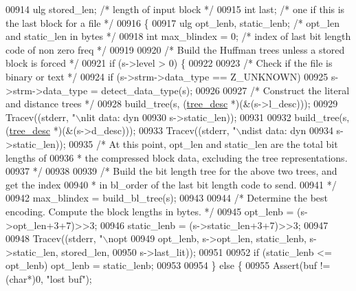 \begin{DoxyCode}
{{{{{{{{{{{{{{{{{{00914     ulg stored\_len;   \textcolor{comment}{/* length of input block */}
00915     \textcolor{keywordtype}{int} last;         \textcolor{comment}{/* one if this is the last block for a file */}
00916 \{
00917     ulg opt\_lenb, static\_lenb; \textcolor{comment}{/* opt\_len and static\_len in bytes */}
00918     \textcolor{keywordtype}{int} max\_blindex = 0;  \textcolor{comment}{/* index of last bit length code of non zero freq */}
00919 
00920     \textcolor{comment}{/* Build the Huffman trees unless a stored block is forced */}
00921     \textcolor{keywordflow}{if} (s->level > 0) \{
00922 
00923         \textcolor{comment}{/* Check if the file is binary or text */}
00924         \textcolor{keywordflow}{if} (s->strm->data\_type == Z\_UNKNOWN)
00925             s->strm->data\_type = detect\_data\_type(s);
00926 
00927         \textcolor{comment}{/* Construct the literal and distance trees */}
00928         build\_tree(s, (\hyperlink{structtree__desc__s}{tree\_desc} *)(&(s->l\_desc)));
00929         Tracev((stderr, \textcolor{stringliteral}{"\(\backslash\)nlit data: dyn %
00930                 s->static\_len));
00931 
00932         build\_tree(s, (\hyperlink{structtree__desc__s}{tree\_desc} *)(&(s->d\_desc)));
00933         Tracev((stderr, \textcolor{stringliteral}{"\(\backslash\)ndist data: dyn %
00934                 s->static\_len));
00935         \textcolor{comment}{/* At this point, opt\_len and static\_len are the total bit lengths of}
00936 \textcolor{comment}{         * the compressed block data, excluding the tree representations.}
00937 \textcolor{comment}{         */}
00938 
00939         \textcolor{comment}{/* Build the bit length tree for the above two trees, and get the index}
00940 \textcolor{comment}{         * in bl\_order of the last bit length code to send.}
00941 \textcolor{comment}{         */}
00942         max\_blindex = build\_bl\_tree(s);
00943 
00944         \textcolor{comment}{/* Determine the best encoding. Compute the block lengths in bytes. */}
00945         opt\_lenb = (s->opt\_len+3+7)>>3;
00946         static\_lenb = (s->static\_len+3+7)>>3;
00947 
00948         Tracev((stderr, \textcolor{stringliteral}{"\(\backslash\)nopt %
00949                 opt\_lenb, s->opt\_len, static\_lenb, s->static\_len, stored\_len,
00950                 s->last\_lit));
00951 
00952         \textcolor{keywordflow}{if} (static\_lenb <= opt\_lenb) opt\_lenb = static\_lenb;
00953 
00954     \} \textcolor{keywordflow}{else} \{
00955         Assert(buf != (\textcolor{keywordtype}{char}*)0, \textcolor{stringliteral}{"lost buf"});
}}}}}}}}}}}}}}}}}}}}}
\end{DoxyCode}
